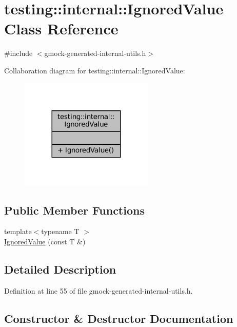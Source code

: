 \hypertarget{classtesting_1_1internal_1_1IgnoredValue}{}\section{testing\+:\+:internal\+:\+:Ignored\+Value Class Reference}
\label{classtesting_1_1internal_1_1IgnoredValue}


{\ttfamily \#include $<$gmock-\/generated-\/internal-\/utils.\+h$>$}



Collaboration diagram for testing\+:\+:internal\+:\+:Ignored\+Value\+:
\nopagebreak
\begin{figure}[H]
\begin{center}
\leavevmode
\includegraphics[width=180pt]{classtesting_1_1internal_1_1IgnoredValue__coll__graph}
\end{center}
\end{figure}
\subsection*{Public Member Functions}
\begin{DoxyCompactItemize}
\item 
{\footnotesize template$<$typename T $>$ }\\\hyperlink{classtesting_1_1internal_1_1IgnoredValue_a6c72839c07a9da8d027efb253144bd91}{Ignored\+Value} (const T \&)
\end{DoxyCompactItemize}


\subsection{Detailed Description}


Definition at line 55 of file gmock-\/generated-\/internal-\/utils.\+h.



\subsection{Constructor \& Destructor Documentation}
\mbox{\label{classtesting_1_1internal_1_1IgnoredValue_a6c72839c07a9da8d027efb253144bd91}} 
